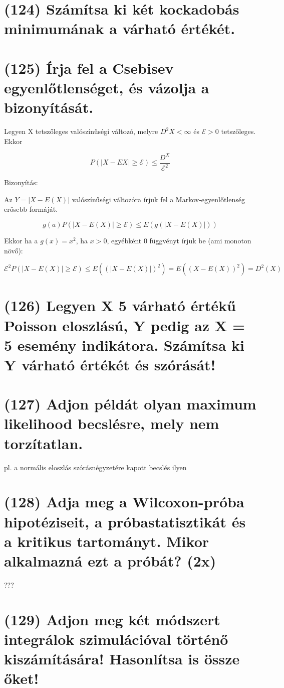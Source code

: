 \documentclass[12p]{article}
\begin{document}
\section{(124) Számítsa ki két kockadobás minimumának a várható értékét.}

\section{(125) Írja fel a Csebisev egyenlőtlenséget, és vázolja a bizonyítását.}

Legyen X tetszőleges valószínűségi változó, melyre $D^2X < \infty$ és $\mathcal{E} > 0$ tetszőleges. Ekkor

$$P(|X - EX| \geq \mathcal{E}) \leq \frac{D^X}{\mathcal{E}^2}$$

Bizonyítás:

Az $Y = |X - E(X)|$ valószínűségi változóra írjuk fel a Markov-egyenlőtlenség erősebb formáját.

$$g(a)P(|X - E(X)| \geq \mathcal{E}) \leq E(g(|X - E(X)|))$$

Ekkor ha a $g(x) = x^2$, ha $x > 0$, egyébként 0 függvényt írjuk be (ami monoton növő):

$$\mathcal{E}^2P(|X - E(X)| \geq \mathcal{E}) \leq E((|X - E(X)|)^2) = E((X - E(X))^2) = D^2(X)$$

\section{(126) Legyen X 5 várható értékű Poisson eloszlású, Y pedig az X = 5 esemény indikátora. Számítsa ki Y várható értékét és szórását!}

\section{(127) Adjon példát olyan maximum likelihood becslésre, mely nem torzítatlan.}

pl. a normális eloszlás szórásnégyzetére kapott becslés ilyen

\section{(128) Adja meg a Wilcoxon-próba hipotéziseit, a próbastatisztikát és a kritikus tartományt.
Mikor alkalmazná ezt a próbát? (2x)}

???

\section{(129) Adjon meg két módszert integrálok szimulációval történő kiszámítására! Hasonlítsa is
össze őket!}
\end{document}
